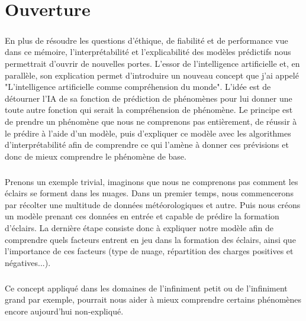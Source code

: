 \chapter{Ouverture}

\paragraph{}En plus de résoudre les questions d'éthique, de fiabilité et de performance vue dans ce mémoire, l'interprétabilité et l'explicabilité des modèles prédictifs nous permettrait d'ouvrir de nouvelles portes. L'essor de l'intelligence artificielle et, en parallèle, son explication permet d'introduire un nouveau concept que j'ai appelé "L'intelligence artificielle comme compréhension du monde". L'idée est de détourner l'IA de sa fonction de prédiction de phénomènes pour lui donner une toute autre fonction qui serait la compréhension de phénomène. Le principe est de prendre un phénomène que nous ne comprenons pas entièrement, de réussir à le prédire à l'aide d'un modèle, puis d'expliquer ce modèle avec les algorithmes d'interprétabilité afin de comprendre ce qui l'amène à donner ces prévisions et donc de mieux comprendre le phénomène de base.

\paragraph{}Prenons un exemple trivial, imaginons que nous ne comprenons pas comment les éclairs se forment dans les nuages. Dans un premier temps, nous commencerons par récolter une multitude de données météorologiques et autre. Puis nous créons un modèle prenant ces données en entrée et capable de prédire la formation d'éclairs. La dernière étape consiste donc à expliquer notre modèle afin de comprendre quels facteurs entrent en jeu dans la formation des éclairs, ainsi que l'importance de ces facteurs (type de nuage, répartition des charges positives et négatives...).

\paragraph{}Ce concept appliqué dans les domaines de l'infiniment petit ou de l'infiniment grand par exemple, pourrait nous aider à mieux comprendre certains phénomènes encore aujourd'hui non-expliqué.